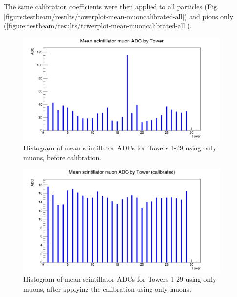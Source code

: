 
The same calibration coefficients were then applied to all particles (Fig. \ref{figure:testbeam/results/towerplot-mean-muoncalibrated-all}) and pions only (\ref{figure:testbeam/results/towerplot-mean-muoncalibrated-all}). 

\begin{figure}[h]
	\centering
	\includegraphics[width=0.95\textwidth]{../Pictures/IDEA/Calibration/new-towerplot-muon-uncal.png}
	\caption{Histogram of mean scintillator \acrshort{ADC}s for Towers 1-29 using only muons, before calibration.}
	\label{figure:testbeam/results/towerplot-mean-uncalibrated-muons}
\end{figure}

\begin{figure}[h]
	\centering
	\includegraphics[width=0.95\textwidth]{../Pictures/IDEA/Calibration/towerplot-scintillator-mean-muoncalibrated-muons.png}
	\caption{Histogram of mean scintillator \acrshort{ADC}s for Towers 1-29 using only muons, after applying the calibration using only muons.}
	\label{figure:testbeam/results/towerplot-mean-muoncalibrated-muons}
\end{figure}

